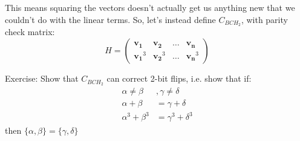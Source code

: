 This means squaring the vectors doesn't actually get us anything new that we couldn't do with the linear terms. So, let's instead define
$C_{BCH_2}$, with parity check matrix:
\[ H = \begin{pmatrix}
    \mathbf{v_1} & \mathbf{v_2} & \dots & \mathbf{v_n} \\
    \mathbf{v_1}^3 & \mathbf{v_2}^3 & \dots & \mathbf{v_n}^3
\end{pmatrix}\]

Exercise: Show that $C_{BCH_2}$ can correct 2-bit flips, i.e. show that if:
\begin{align*} 
    \alpha \neq \beta &, \gamma \neq \delta \\
    \alpha + \beta &= \gamma + \delta \\
    \alpha^3 + \beta^3 &= \gamma^3 + \delta^3
\end{align*}
then $\{\alpha, \beta\} = \{\gamma, \delta\}$